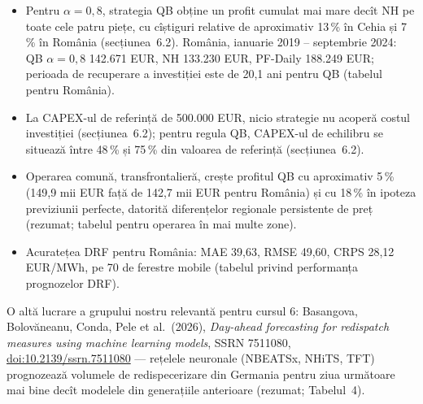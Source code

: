 \textbf{}
\begin{itemize}
\item {}%
{Pentru $\alpha=0{,}8$, strategia QB obține un profit cumulat mai mare decît NH pe toate cele patru piețe, cu cîștiguri relative de aproximativ 13\,\% în Cehia și 7\,\% în România (secțiunea~6.2).
România, ianuarie 2019 -- septembrie 2024: QB $\alpha=0{,}8$ 142.671 EUR, NH 133.230 EUR, PF-Daily 188.249 EUR; perioada de recuperare a investiției este de 20,1 ani pentru QB (tabelul pentru România).}
\item {}%
{La CAPEX-ul de referință de 500.000 EUR, nicio strategie nu acoperă costul investiției (secțiunea~6.2); pentru regula QB, CAPEX-ul de echilibru se situează între 48\,\% și 75\,\% din valoarea de referință (secțiunea~6.2).}
\item {}%
{Operarea comună, transfrontalieră, crește profitul QB cu aproximativ 5\,\% (149,9 mii EUR față de 142,7 mii EUR pentru România) și cu 18\,\% în ipoteza previziunii perfecte, datorită diferențelor regionale persistente de preț (rezumat; tabelul pentru operarea în mai multe zone).}
\item {}%
{Acuratețea DRF pentru România: MAE 39,63, RMSE 49,60, CRPS 28,12 EUR/MWh, pe 70 de ferestre mobile (tabelul privind performanța prognozelor DRF).}
\end{itemize}
{\footnotesize\color{FooterGray}%
{O altă lucrare a grupului nostru relevantă pentru cursul 6: Basangova, Bolovăneanu, Conda, Pele et al.\ (2026), \emph{Day-ahead forecasting for redispatch measures using machine learning models}, SSRN 7511080, \href{https://doi.org/10.2139/ssrn.7511080}{doi:10.2139/ssrn.7511080} --- rețelele neuronale (NBEATSx, NHiTS, TFT) prognozează volumele de redispecerizare din Germania pentru ziua următoare mai bine decît modelele din generațiile anterioare (rezumat; Tabelul~4).}}

